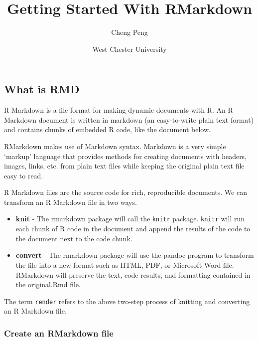 \documentclass[
]{article}
\title{Getting Started With RMarkdown}
\author{Cheng Peng}
\date{West Chester University}
\begin{document}
\maketitle

\hypertarget{section}{%
\section{}\label{section}}

\hypertarget{what-is-rmd}{%
\subsection{What is RMD}\label{what-is-rmd}}

R Markdown is a file format for making dynamic documents with R. An R
Markdown document is written in markdown (an easy-to-write plain text
format) and contains chunks of embedded R code, like the document below.

RMarkdown makes use of Markdown syntax. Markdown is a very simple
`markup' language that provides methods for creating documents with
headers, images, links, etc. from plain text files while keeping the
original plain text file easy to read.

R Markdown files are the source code for rich, reproducible documents.
We can transform an R Markdown file in two ways.

\begin{itemize}
\item
  \textbf{knit} - The rmarkdown package will call the \texttt{knitr}
  package. \texttt{knitr} will run each chunk of R code in the document
  and append the results of the code to the document next to the code
  chunk.
\item
  \textbf{convert} - The rmarkdown package will use the pandoc program
  to transform the file into a new format such as HTML, PDF, or
  Microsoft Word file. RMarkdown will preserve the text, code results,
  and formatting contained in the original.Rmd file.
\end{itemize}

The term \texttt{render} refers to the above two-step process of
knitting and converting an R Markdown file.

\hypertarget{create-an-rmarkdown-file}{%
\subsubsection{Create an RMarkdown
file}\label{create-an-rmarkdown-file}}
\end{document}
